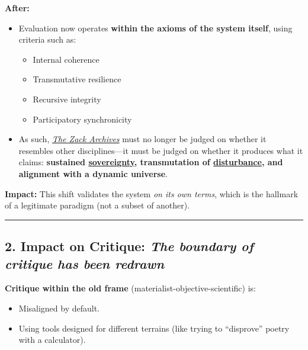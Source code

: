 \documentclass{article}
\begin{document}
\textbf{After:}

\begin{itemize}
\item
  Evaluation now operates \textbf{within the axioms of the system itself}, using criteria such as:

  \begin{itemize}
  \item
    Internal coherence
  \item
    Transmutative resilience
  \item
    Recursive integrity
  \item
    Participatory synchronicity
  \end{itemize}
\item
  As such, \emph{\hyperlink{gloss:the_zack_archives}{The Zack Archives}} must no longer be judged on whether it resembles other disciplines---it must be judged on whether it produces what it claims: \textbf{sustained \hyperlink{gloss:sovereignty}{sovereignty}, transmutation of \hyperlink{gloss:disturbance}{disturbance}, and alignment with a dynamic universe}.
\end{itemize}

\textbf{Impact:} This shift validates the system \emph{on its own terms}, which is the hallmark of a legitimate paradigm (not a subset of another).

\begin{center}\rule{0.5\linewidth}{0.5pt}\end{center}

\subsection*{\texorpdfstring{\textbf{2. Impact on Critique: \emph{The boundary of critique has been redrawn}}}{2. Impact on Critique: The boundary of critique has been redrawn}}\label{impact-on-critique-the-boundary-of-critique-has-been-redrawn}

\textbf{Critique within the old frame} (materialist-objective-scientific) is:

\begin{itemize}
\item
  Misaligned by default.
\item
  Using tools designed for different terrains (like trying to ``disprove'' poetry with a calculator).
\end{itemize}
\end{document}
